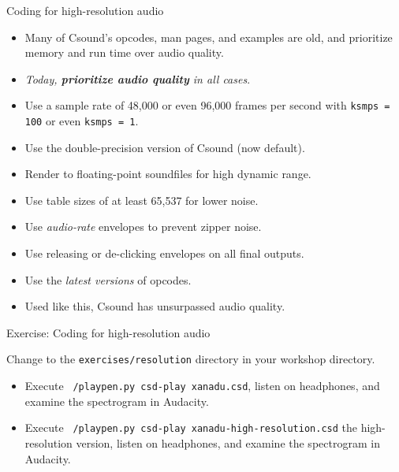 \documentclass{beamer}
\begin{document}
\begin{frame}{Coding for high-resolution audio}
\begin{itemize}
\item Many of Csound's opcodes, man pages, and examples are old, and
prioritize memory and run time over audio quality.
\item \textit{Today, \textbf{prioritize audio quality} in all cases}.
\item Use a sample rate of 48,000 or even 96,000 frames per second with
\texttt{ksmps = 100} or even \texttt{ksmps = 1}.
\item Use the double-precision version of Csound (now default).
\item Render to floating-point soundfiles for high dynamic range.
\item Use table sizes of at least 65,537 for lower noise.
\item Use \textit{audio-rate} envelopes to prevent zipper noise.
\item Use releasing or de-clicking envelopes on all final outputs.
\item Use the \textit{latest versions} of opcodes.
\item Used like this, Csound has unsurpassed audio quality.
\end{itemize}
\end{frame}

\begin{frame}{Exercise: Coding for high-resolution audio}
\begin{example}
Change to the \texttt{exercises/resolution} directory in your workshop directory.
\begin{itemize}
\item Execute \texttt{~/playpen.py csd-play xanadu.csd}, listen on headphones, and examine the spectrogram in Audacity.
\item Execute \texttt{~/playpen.py csd-play xanadu-high-resolution.csd} the high-resolution version, listen on headphones, and examine the spectrogram in Audacity.
\end{itemize}
\end{example}
\end{frame}
\end{document}
